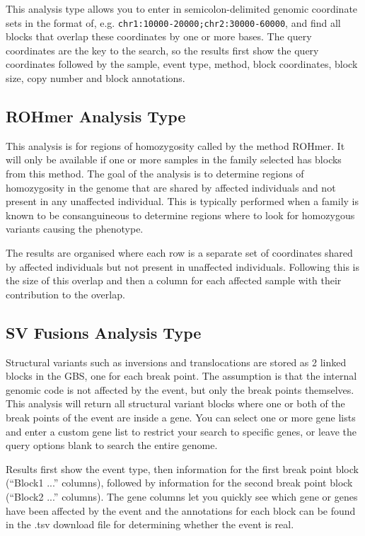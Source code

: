 \documentclass[11pt, a4paper]{article}
\begin{document}
This analysis type allows you to enter in semicolon-delimited genomic coordinate sets in the format of, e.g. \texttt{chr1:10000-20000;chr2:30000-60000}, and find all blocks that overlap these coordinates by one or more bases. The query coordinates are the key to the search, so the results first show the query coordinates followed by the sample, event type, method, block coordinates, block size, copy number and block annotations.

\subsection{ROHmer Analysis Type}

This analysis is for regions of homozygosity called by the method ROHmer. It will only be available if one or more samples in the family selected has blocks from this method. The goal of the analysis is to determine regions of homozygosity in the genome that are shared by affected individuals and not present in any unaffected individual. This is typically performed when a family is known to be consanguineous to determine regions where to look for homozygous variants causing the phenotype.

The results are organised where each row is a separate set of coordinates shared by affected individuals but not present in unaffected individuals. Following this is the size of this overlap and then a column for each affected sample with their contribution to the overlap.

\subsection{SV Fusions Analysis Type}

Structural variants such as inversions and translocations are stored as 2 linked blocks in the GBS, one for each break point. The assumption is that the internal genomic code is not affected by the event, but only the break points themselves. This analysis will return all structural variant blocks where one or both of the break points of the event are inside a gene. You can select one or more gene lists and enter a custom gene list to restrict your search to specific genes, or leave the query options blank to search the entire genome.

Results first show the event type, then information for the first break point block (``Block1 ...'' columns), followed by information for the second break point block (``Block2 ...'' columns). The gene columns let you quickly see which gene or genes have been affected by the event and the annotations for each block can be found in the .tsv download file for determining whether the event is real.


\end{document}
